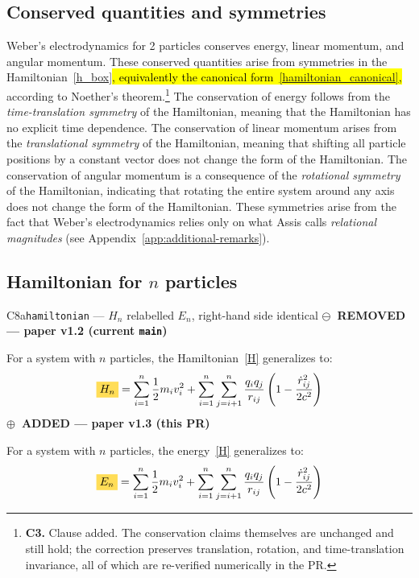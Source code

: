 \documentclass[12pt,a4paper]{article}
\theoremstyle{definition}
\theoremstyle{remark}
\newcommand{\oldtag}{{\sffamily\bfseries\footnotesize
  \textcolor{oldink}{$\ominus$~REMOVED \textnormal{\textmd{— paper v1.2 (current \texttt{main})}}}}\par\smallskip}
\newcommand{\newtag}{{\sffamily\bfseries\footnotesize
  \textcolor{newink}{$\oplus$~ADDED \textnormal{\textmd{— paper v1.3 (this PR)}}}}\par\smallskip}
\newcommand{\dins}[1]{\hl{#1}}
\newcommand{\sgnc}[1]{{\colorbox{sigbg}{$#1$}}}
\newcommand{\wchg}[1]{\colorbox{sigbg}{#1}}
\newcommand{\eqnote}[1]{\par\smallskip{\footnotesize\sffamily\textcolor{barink}{#1}}\par}
\begin{document}
\subsection{Conserved quantities and symmetries}
Weber's electrodynamics for 2 particles conserves energy, linear momentum, and angular momentum. These conserved quantities arise from symmetries in the Hamiltonian~\eqref{h_box}\dins{, equivalently the canonical form~\mbox{\eqref{hamiltonian_canonical}},} according to Noether's theorem.\footnote{\textbf{C3.} Clause added. The conservation claims themselves are unchanged and still hold; the correction preserves translation, rotation, and time-translation invariance, all of which are re-verified numerically in the PR.} The conservation of energy follows from the \textit{time-translation symmetry} of the Hamiltonian, meaning that the Hamiltonian has no explicit time dependence. The conservation of linear momentum arises from the \textit{translational symmetry} of the Hamiltonian, meaning that shifting all particle positions by a constant vector does not change the form of the Hamiltonian. The conservation of angular momentum is a consequence of the \textit{rotational symmetry} of the Hamiltonian, indicating that rotating the entire system around any axis does not change the form of the Hamiltonian. These symmetries arise from the fact that Weber's electrodynamics relies only on what Assis calls \textit{relational magnitudes} (see Appendix~\ref{app:additional-remarks}).

\subsection{Hamiltonian for \texorpdfstring{$n$}{n} particles}\label{n-body-hamiltonian}
\begin{diffbox}{C8a}{\texttt{hamiltonian} --- $H_n$ relabelled $E_n$, right-hand side identical}
\oldtag
For a system with $n$ particles, the \wchg{Hamiltonian}~\eqref{H} generalizes to:
\begin{equation*}
    \sgnc{H_n} = \sum_{i=1}^{n} \frac{1}{2} m_i v_i^2 + \sum_{i=1}^{n} \sum_{j=i+1}^{n} \frac{q_i q_j}{r_{ij}} \left(1 - \frac{\dot{r}_{ij}^2}{2 c^2}\right)
\end{equation*}
\tcblower
\newtag
For a system with $n$ particles, the \wchg{energy}~\eqref{H} generalizes to:
\begin{equation}\label{hamiltonian}
    \sgnc{E_n} = \sum_{i=1}^{n} \frac{1}{2} m_i v_i^2 + \sum_{i=1}^{n} \sum_{j=i+1}^{n} \frac{q_i q_j}{r_{ij}} \left(1 - \frac{\dot{r}_{ij}^2}{2 c^2}\right)
\end{equation}
\eqnote{The right-hand side is unchanged to the byte. It was always the
velocity-space energy; calling it a Hamiltonian and then feeding it to
Hamilton's equations in $(q,p)$ was the error. Renaming it $E_n$ frees the
symbol $H_n$ for the genuine canonical Hamiltonian added below.}
\end{diffbox}
\end{document}
